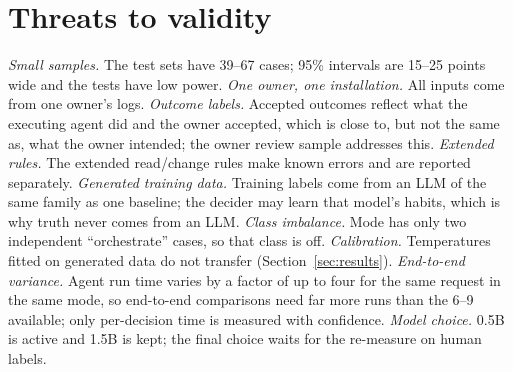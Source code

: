 \section{Threats to validity}\label{sec:threats}
\emph{Small samples.} The test sets have 39--67 cases; 95\% intervals are 15--25 points wide and the tests have low power. \emph{One owner, one installation.} All inputs come from one owner's logs. \emph{Outcome labels.} Accepted outcomes reflect what the executing agent did and the owner accepted, which is close to, but not the same as, what the owner intended; the owner review sample addresses this. \emph{Extended rules.} The extended read/change rules make known errors and are reported separately. \emph{Generated training data.} Training labels come from an LLM of the same family as one baseline; the decider may learn that model's habits, which is why truth never comes from an LLM. \emph{Class imbalance.} Mode has only two independent ``orchestrate'' cases, so that class is off. \emph{Calibration.} Temperatures fitted on generated data do not transfer (Section~\ref{sec:results}). \emph{End-to-end variance.} Agent run time varies by a factor of up to four for the same request in the same mode, so end-to-end comparisons need far more runs than the 6--9 available; only per-decision time is measured with confidence. \emph{Model choice.} 0.5B is active and 1.5B is kept; the final choice waits for the re-measure on human labels.
